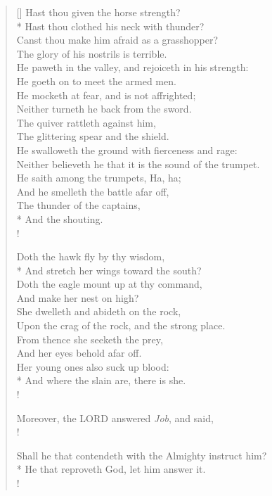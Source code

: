 \documentclass[MAIN]{subfiles}
\begin{document}
\begin{verse}[\versewidth]
Hast thou given the horse strength?\\*
\vin Hast thou clothed his neck with thunder?\\
Canst thou make him afraid as a grasshopper?\\
\vin The glory of his nostrils is terrible.\\
He paweth in the valley, and rejoiceth in his strength:\\
\vin He goeth on to meet the armed men.\\
He mocketh at fear, and is not affrighted;\\
\vin Neither turneth he back from the sword.\\
The quiver rattleth against him,\\
\vin The glittering spear and the shield.\\
He swalloweth the ground with fierceness and rage:\\
\vin Neither believeth he that it is the sound of the trumpet.\\
He saith among the trumpets, Ha, ha;\\
\vin And he smelleth the battle afar off,\\
The thunder of the captains,\\*
\vin And the shouting.\\!

Doth the hawk fly by thy wisdom,\\*
\vin And stretch her wings toward the south?\\
Doth the eagle mount up at thy command,\\
\vin And make her nest on high?\\
She dwelleth and abideth on the rock,\\
\vin Upon the crag of the rock, and the strong place.\\
From thence she seeketh the prey,\\
\vin And her eyes behold afar off.\\
Her young ones also suck up blood:\\*
\vin And where the slain are, there is she.\\!

Moreover, the {\hge LORD} answered \emph{Job}, and said,\\!

Shall he that contendeth with the Almighty instruct him?\\*
\vin He that reproveth God, let him answer it.\\!


\end{verse}
\end{document}
